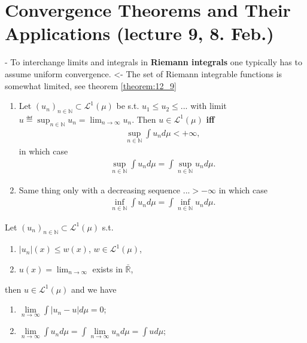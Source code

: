 \section{Convergence Theorems and Their Applications (lecture 9, 8. Feb.)}
- To interchange limits and integrals in \textbf{Riemann integrals} one typically has to assume uniform convergence. <- The set of Riemann
integrable functions is somewhat limited, see theorem \ref{theorem:12_9}

\begin{theorem}
    \quad
    
    \begin{enumerate}[label=(\roman*)]
        \item Let \((u_n)_{n\in\mathbb{N}}\subset \mathcal{L}^{1}(\mu)\) be s.t. \(u_1\leq u_2 \leq ...\) with limit 
        \(u\eqdef \sup_{n\in\mathbb{N}}u_n = \lim_{n\rightarrow\infty} u_n\). Then \(u\in\mathcal{L}^{1}(\mu)\) \textbf{iff} 
        \begin{eqnarray*}
            \sup\limits_{n\in\mathbb{N}}\int u_nd\mu <+\infty,
        \end{eqnarray*}
        in which case
        \begin{eqnarray*}
            \sup\limits_{n\in\mathbb{N}}\int u_n d\mu = \int\sup\limits_{n\in\mathbb{N}}u_n d\mu.
        \end{eqnarray*}
        \item Same thing only with a decreasing sequence ...\(>-\infty\) in which case
        \begin{eqnarray*}
            \inf\limits_{n\in\mathbb{N}}\int u_n d\mu = \int\inf\limits_{n\in\mathbb{N}}u_n d\mu.
        \end{eqnarray*}
    \end{enumerate}
\end{theorem}

\begin{theorem}
    Let \((u_n)_{n\in\mathbb{N}}\subset\mathcal{L}^{1}(\mu)\) s.t.
    \begin{enumerate}[label=(\alph*)]
        \item \(|u_n|(x)\leq w(x)\), \(w\in\mathcal{L}^{1}(\mu)\),
        \item \(u(x) = \lim_{n\rightarrow\infty}\) exists in \(\bar{\mathbb{R}}\),
    \end{enumerate}
    then \(u\in\mathcal{L}^{1}(\mu)\) and we have
    \begin{enumerate}[label=(\roman*)]
        \item \(\lim\limits_{n\rightarrow\infty} \int \vert u_n - u\vert d\mu = 0\);
        \item \(\lim\limits_{n\rightarrow\infty} \int u_n d\mu = \int\lim\limits_{n\rightarrow\infty}u_n d\mu = \int ud\mu\);
    \end{enumerate}
\end{theorem}
\ifdetailed
